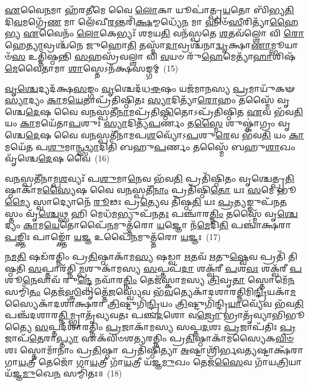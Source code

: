\-\ul{𑌏}\-𑌵𑍈\-\ul{𑌨}\-𑌮𑌾 𑌹᳴𑌰\-\ul{𑌤𑍀}\-𑌮𑍇 𑌵𑍈 \ul{𑌲𑍋}\-𑌕𑌾 𑌯𑍂𑌪𑌾॑𑌤𑍍𑌪𑍍𑌰\-\ul{𑌯}\-𑌤𑍋 𑌬𑌿᳴𑌭𑍍𑌯\-\ul{𑌤𑌿} 𑌦𑌿\-\ul{𑌵}\-𑌮𑌗𑍍𑌰𑍇᳴\-\ul{𑌣} 𑌮𑌾 𑌲𑍇᳴𑌖𑍀\-\ul{𑌰}\-𑌨𑍍𑌤𑌰𑌿᳴\-\ul{𑌕𑍍𑌷}\-𑌮𑍍𑌮𑌧𑍍𑌯𑍇᳴\-\ul{𑌨} 𑌮𑌾 𑌹𑌿𑍞᳴\-\ul{𑌸𑍀}\-𑌰𑌿𑌤𑍍𑌯𑌾᳴\-\ul{𑌹𑍈}\-𑌭𑍍𑌯 \ul{𑌏}\-𑌵𑍈𑌨𑌂᳴ \ul{𑌲𑍋}\-𑌕𑍇𑌭𑍍𑌯𑌃᳴ 𑌶𑌮𑌯\-\ul{𑌤𑌿} 𑌵𑌨᳴𑌸𑍍𑌪𑌤𑍇 \ul{𑌶}\-𑌤𑌵᳴𑌲𑍍\mbox{}\-\ul{𑌶𑍋} 𑌵𑌿 \ul{𑌰𑍋}\-𑌹𑍇\-\ul{𑌤𑍍𑌯𑌾}\-𑌵𑍍𑌰𑌶𑍍𑌚᳴𑌨𑍇 𑌜𑍁𑌹𑍋\-\ul{𑌤𑌿} 𑌤𑌸𑍍𑌮𑌾᳴\-\ul{𑌦𑌾}\-𑌵𑍍𑌰𑌶𑍍𑌚᳴𑌨𑌾\-\ul{𑌦𑍍𑌵𑍃}\-𑌕𑍍𑌷𑌾\-\ul{𑌣𑌾}\-𑌮𑍍𑌭𑍂𑌯𑌾𑍞᳴\-\ul{𑌸} 𑌉𑌤𑍍𑌤𑌿᳴𑌷𑍍𑌠𑌨𑍍𑌤𑌿 \ul{𑌸}\-𑌹𑌸𑍍𑌰᳴𑌵𑌲𑍍\mbox{}\-\ul{𑌶𑌾} 𑌵𑌿 \ul{𑌵}\-𑌯𑍞 𑌰𑍁᳴\-\ul{𑌹𑍇}\-𑌮𑍇𑌤𑍍𑌯𑌾᳴\-\ul{𑌹𑌾}\-𑌶𑌿𑌷᳴\-\ul{𑌮𑍇}\-𑌵𑍈𑌤𑌾𑌮𑌾 \ul{𑌶𑌾}\-𑌸𑍍𑌤𑍇\-𑌽𑌨᳴𑌕𑍍𑌷𑌸𑌙𑍍𑌗𑌮𑍍~(15)

\-\ul{𑌵𑍃}\-\-\ul{𑌶𑍍𑌚𑍇}\-𑌦𑍍𑌯𑌦᳴𑌕𑍍𑌷\-\ul{𑌸}\-𑌙𑍍𑌗𑌂 \ul{𑌵𑍃}\-𑌶𑍍𑌚𑍇𑌦᳴𑌧\-\ul{𑌈}\-𑌷𑌂 𑌯𑌜᳴𑌮𑌾𑌨𑌸𑍍𑌯 \ul{𑌪𑍍𑌰}\-𑌮𑌾𑌯𑍁᳴𑌕𑍟 \ul{𑌸𑍍𑌯𑌾}\-𑌦𑍍𑌯𑌂 \ul{𑌕𑌾}\-𑌮\-\ul{𑌯𑍇}\-𑌤𑌾𑌪𑍍𑌰᳴𑌤𑌿𑌷𑍍𑌠𑌿𑌤𑌃 \ul{𑌸𑍍𑌯𑌾}\-𑌦𑌿𑌤𑍍𑌯𑌾᳴\-\ul{𑌰𑍋}\-𑌹𑌂 𑌤𑌸𑍍𑌮𑍈᳴ 𑌵𑍃𑌶𑍍𑌚𑍇\-\ul{𑌦𑍇}\-𑌷 𑌵𑍈 𑌵\-\ul{𑌨}\-𑌸𑍍𑌪𑌤𑍀᳴\-\ul{𑌨𑌾}\-𑌮𑌪𑍍𑌰᳴𑌤𑌿\-\ul{𑌷𑍍𑌠𑌿}\-𑌤𑍋\-𑌽𑌪𑍍𑌰᳴𑌤𑌿𑌷𑍍𑌠𑌿𑌤 \ul{𑌏}\-𑌵 𑌭᳴𑌵\-\ul{𑌤𑌿} 𑌯𑌂 \ul{𑌕𑌾}\-𑌮𑌯𑍇᳴𑌤𑌾\-\ul{𑌪}\-𑌶𑍁𑌃 \ul{𑌸𑍍𑌯𑌾}\-𑌦𑌿𑌤𑍍𑌯᳴\-\ul{𑌪}\-𑌰𑍍𑌣𑌂 𑌤\-\ul{𑌸𑍍𑌮𑍈} 𑌶𑍁𑌷𑍍𑌕𑌾॑𑌗𑍍𑌰𑌂 𑌵𑍃𑌶𑍍𑌚𑍇\-\ul{𑌦𑍇}\-𑌷 𑌵𑍈 𑌵\-\ul{𑌨}\-𑌸𑍍𑌪𑌤𑍀᳴𑌨𑌾𑌮𑌪\-\ul{𑌶}\-𑌵𑍍𑌯𑍋᳴\-𑌽\-\ul{𑌪}\-𑌶𑍁\-\ul{𑌰𑍇}\-𑌵 𑌭᳴𑌵\-\ul{𑌤𑌿} 𑌯𑌂 \ul{𑌕𑌾}\-𑌮𑌯𑍇᳴𑌤 𑌪\-\ul{𑌶𑍁}\-𑌮𑌾\-\ul{𑌨𑍍𑌥𑍍𑌸𑍍𑌯𑌾}\-𑌦𑌿𑌤𑌿᳴ 𑌬𑌹𑍁\-\ul{𑌪}\-𑌰𑍍𑌣𑌂 𑌤𑌸𑍍𑌮𑍈᳴ 𑌬𑌹𑍁\-\ul{𑌶𑌾}\-𑌖𑌂 𑌵𑍃᳴𑌶𑍍𑌚𑍇\-\ul{𑌦𑍇}\-𑌷 𑌵𑍈~(16)

𑌵\-\ul{𑌨}\-𑌸𑍍𑌪𑌤𑍀᳴𑌨𑌾𑌮𑍍𑌪\-\ul{𑌶}\-𑌵𑍍𑌯𑌃᳴ 𑌪\-\ul{𑌶𑍁}\-𑌮𑌾\-\ul{𑌨𑍇}\-𑌵 𑌭᳴𑌵\-\ul{𑌤𑌿} 𑌪𑍍𑌰𑌤𑌿᳴𑌷𑍍𑌠𑌿𑌤𑌂 𑌵𑍃𑌶𑍍𑌚𑍇𑌤𑍍𑌪𑍍𑌰\-\ul{𑌤𑌿}\-𑌷𑍍𑌠𑌾𑌕𑌾᳴𑌮\-\ul{𑌸𑍍𑌯𑍈}\-𑌷 𑌵𑍈 𑌵\-\ul{𑌨}\-𑌸𑍍𑌪𑌤𑍀᳴\-\ul{𑌨𑌾𑌂} 𑌪𑍍𑌰𑌤𑌿᳴𑌷𑍍𑌠𑌿\-\ul{𑌤𑍋} 𑌯𑌃 \ul{𑌸}\-𑌮𑍇 𑌭𑍂\-\ul{𑌮𑍍𑌯𑍈} 𑌸𑍍𑌵𑌾𑌦𑍍𑌯𑍋𑌨𑍇᳴ \ul{𑌰𑍂}\-𑌢𑌃 𑌪𑍍𑌰\-\ul{𑌤𑍍𑌯𑍇}\-𑌵 𑌤𑌿᳴𑌷𑍍𑌠\-\ul{𑌤𑌿} 𑌯𑌃 \ul{𑌪𑍍𑌰}\-𑌤𑍍𑌯𑌙𑍍𑌙𑍁𑌪᳴𑌨\-\ul{𑌤}\-𑌸𑍍𑌤𑌂 𑌵𑍃᳴\-\ul{𑌶𑍍𑌚𑍇}\-𑌥𑍍𑌸 𑌹𑌿 𑌮𑍇𑌧᳴\-\ul{𑌮}\-𑌭𑍍𑌯𑍁𑌪᳴𑌨\-\ul{𑌤𑌃} 𑌪𑌞𑍍𑌚𑌾᳴𑌰\-\ul{𑌤𑍍𑌨𑌿𑌂} 𑌤𑌸𑍍𑌮𑍈᳴ 𑌵𑍃\-\ul{𑌶𑍍𑌚𑍇}\-𑌦𑍍𑌯𑌂 \ul{𑌕𑌾}\-𑌮\-\ul{𑌯𑍇}\-𑌤𑍋𑌪𑍈᳴\-\ul{𑌨}\-𑌮𑍁𑌤𑍍𑌤᳴𑌰𑍋 \ul{𑌯}\-𑌜𑍍𑌞𑍋 𑌨᳴\-\ul{𑌮𑍇}\-𑌦𑌿\-\ul{𑌤𑌿} 𑌪𑌞𑍍𑌚𑌾॑𑌕𑍍𑌷𑌰𑌾 \ul{𑌪}\-𑌙𑍍𑌕𑍍𑌤𑌿𑌃 𑌪𑌾𑌙𑍍𑌕𑍍𑌤𑍋᳴ \ul{𑌯}\-𑌜𑍍𑌞 𑌉𑌪𑍈᳴\-\ul{𑌨}\-𑌮𑍁𑌤𑍍𑌤᳴𑌰𑍋 \ul{𑌯}\-𑌜𑍍𑌞𑌃~(17)

\-\ul{𑌨}\-\-\ul{𑌮}\-\-\ul{𑌤𑌿} 𑌷𑌡᳴𑌰𑌤𑍍𑌨𑌿𑌂 𑌪𑍍𑌰\-\ul{𑌤𑌿}\-𑌷𑍍𑌠𑌾𑌕𑌾᳴𑌮\-\ul{𑌸𑍍𑌯} 𑌷𑌡𑍍𑌵𑌾 \ul{𑌋}\-𑌤𑌵᳴ \ul{𑌋}\-𑌤𑍁\-\ul{𑌷𑍍𑌵𑍇}\-𑌵 𑌪𑍍𑌰𑌤𑌿᳴ 𑌤𑌿𑌷𑍍𑌠𑌤𑌿 \ul{𑌸}\-𑌪𑍍𑌤𑌾𑌰᳴𑌤𑍍𑌨𑌿\-\ul{𑌮𑍍𑌪}\-𑌶𑍁𑌕𑌾᳴𑌮𑌸𑍍𑌯 \ul{𑌸}\-𑌪𑍍𑌤𑌪᳴\-\ul{𑌦𑌾} 𑌶𑌕𑍍𑌵᳴𑌰𑍀 \ul{𑌪}\-𑌶\-\ul{𑌵𑌃} 𑌶𑌕𑍍𑌵᳴𑌰𑍀 \ul{𑌪}\-𑌶𑍂\-\ul{𑌨𑍇}\-𑌵𑌾𑌵᳴ 𑌰𑍁\-\ul{𑌨𑍍𑌦𑍍𑌧𑍇} 𑌨𑌵𑌾᳴𑌰\-\ul{𑌤𑍍𑌨𑌿𑌂} 𑌤𑍇𑌜᳴𑌸𑍍𑌕𑌾𑌮𑌸𑍍𑌯 \ul{𑌤𑍍𑌰𑌿}\-𑌵𑍃\-\ul{𑌤𑌾} 𑌸𑍍𑌤𑍋𑌮𑍇᳴\-\ul{𑌨} 𑌸𑌮𑍍𑌮𑌿᳴\-\ul{𑌤𑌂} 𑌤𑍇𑌜᳴\-\ul{𑌸𑍍𑌤𑍍𑌰𑌿}\-𑌵𑍃𑌤𑍍𑌤𑍇᳴\-\ul{𑌜}\-𑌸𑍍𑌵𑍍𑌯𑍇᳴𑌵 𑌭᳴\-\ul{𑌵}\-𑌤𑍍𑌯𑍇𑌕𑌾᳴\-𑌦𑌶𑌾𑌰𑌤𑍍𑌨𑌿\-𑌮𑌿\-\ul{𑌨𑍍𑌦𑍍𑌰𑌿}\-𑌯𑌕𑌾᳴\-\ul{𑌮}\-𑌸𑍍𑌯𑍈𑌕𑌾᳴\-𑌦𑌶𑌾𑌕𑍍𑌷𑌰𑌾 \ul{𑌤𑍍𑌰𑌿}\-𑌷𑍍𑌟𑍁𑌗𑌿᳴\-\ul{𑌨𑍍𑌦𑍍𑌰𑌿}\-𑌯𑌂 \ul{𑌤𑍍𑌰𑌿}\-𑌷𑍍𑌟𑍁𑌗𑌿᳴𑌨𑍍𑌦𑍍𑌰𑌿\-\ul{𑌯𑌾}\-𑌵𑍍𑌯𑍇᳴𑌵 𑌭᳴𑌵\-\ul{𑌤𑌿} 𑌪𑌞𑍍𑌚᳴𑌦𑌶𑌾𑌰\-\ul{𑌤𑍍𑌨𑌿}\-𑌮𑍍𑌭𑍍𑌰𑌾𑌤𑍃᳴𑌵𑍍𑌯𑌵𑌤𑌃 𑌪𑌞𑍍𑌚\-\ul{𑌦}\-𑌶𑍋 𑌵\-\ul{𑌜𑍍𑌰𑍋} 𑌭𑍍𑌰𑌾𑌤𑍃᳴𑌵𑍍𑌯𑌾𑌭𑌿𑌭𑍂𑌤𑍍𑌯𑍈 \ul{𑌸}\-𑌪𑍍𑌤𑌦᳴𑌶𑌾𑌰𑌤𑍍𑌨𑌿𑌂 \ul{𑌪𑍍𑌰}\-𑌜𑌾𑌕𑌾᳴𑌮𑌸𑍍𑌯 𑌸𑌪𑍍𑌤\-\ul{𑌦}\-𑌶𑌃 \ul{𑌪𑍍𑌰}\-𑌜𑌾𑌪᳴𑌤𑌿𑌃 \ul{𑌪𑍍𑌰}\-𑌜𑌾𑌪᳴\-\ul{𑌤𑍇}\-𑌰𑌾\-\ul{𑌪𑍍𑌤𑍍𑌯𑌾} 𑌏𑌕᳴𑌵𑌿𑍞𑌶𑌤𑍍𑌯𑌰𑌤𑍍𑌨𑌿𑌂 𑌪𑍍𑌰\-\ul{𑌤𑌿}\-𑌷𑍍𑌠𑌾𑌕𑌾᳴𑌮𑌸𑍍𑌯𑍈𑌕\-\-\ul{𑌵𑌿}\-\-\ul{𑍞}\-𑌶𑌃 𑌸𑍍𑌤𑍋𑌮𑌾᳴𑌨𑌾𑌂 𑌪𑍍𑌰\-\ul{𑌤𑌿}\-𑌷𑍍𑌠𑌾 𑌪𑍍𑌰𑌤𑌿᳴𑌷𑍍𑌠𑌿𑌤𑍍𑌯𑌾 \ul{𑌅}\-𑌷𑍍𑌟𑌾𑌶𑍍𑌰𑌿᳴𑌰𑍍𑌭𑌵\-\ul{𑌤𑍍𑌯}\-𑌷𑍍𑌟𑌾𑌕𑍍𑌷᳴𑌰𑌾 𑌗𑌾\-\ul{𑌯}\-𑌤𑍍𑌰𑍀 𑌤𑍇𑌜𑍋᳴ 𑌗𑌾\-\ul{𑌯}\-𑌤𑍍𑌰𑍀 𑌗𑌾᳴\-\ul{𑌯}\-𑌤𑍍𑌰𑍀 𑌯᳴𑌜𑍍𑌞\-\ul{𑌮𑍁}\-𑌖𑌂 𑌤𑍇𑌜᳴\-\ul{𑌸𑍈}\-𑌵 𑌗𑌾᳴𑌯\-\ul{𑌤𑍍𑌰𑌿}\-𑌯𑌾 𑌯᳴𑌜𑍍𑌞\-\ul{𑌮𑍁}\-𑌖𑍇\-\ul{𑌨} 𑌸𑌮𑍍𑌮𑌿᳴𑌤𑌃॥~(18)

